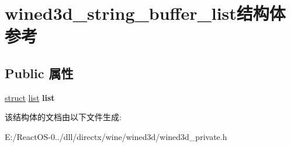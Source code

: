 \hypertarget{structwined3d__string__buffer__list}{}\section{wined3d\+\_\+string\+\_\+buffer\+\_\+list结构体 参考}
\label{structwined3d__string__buffer__list}
\subsection*{Public 属性}
\begin{DoxyCompactItemize}
\item 
\mbox{\label{structwined3d__string__buffer__list_acd825a83aea1140552a7d39453fe1572}} 
\hyperlink{interfacestruct}{struct} \hyperlink{classlist}{list} {\bfseries list}
\end{DoxyCompactItemize}


该结构体的文档由以下文件生成\+:\begin{DoxyCompactItemize}
\item 
E\+:/\+React\+O\+S-\/0../dll/directx/wine/wined3d/wined3d\+\_\+private.\+h\end{DoxyCompactItemize}
